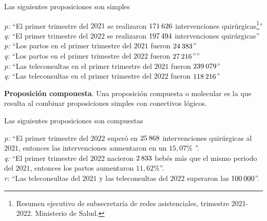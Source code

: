 \begin{myexample}
Las siguientes  proposiciones son simples
\end{myexample}
\noindent\textit{p:} ``El primer trimestre del $2021$ se realizaron $171\hspace{2px}626$ intervenciones quirúrgicas\footnote{Resumen ejecutivo de subsecretaría de redes asistenciales, trimestre 2021-2022. Ministerio de Salud.}''\\
\textit{q:} ``El primer trimestre del $2022$ se realizaron $197\hspace{2px}494$ intervenciones quirúrgicas''\\

\noindent\textit{p:} ``Los partos en el primer trimestre del $2021$ fueron $24\hspace{2px}383$''\\
\textit{q:} ``Los partos en el primer trimestre del $2022$ fueron $27\hspace{2px}216$''''\\

\noindent\textit{p:} ``Las teleconsultas en el primer trimestre del $2021$ fueron $239\hspace{2px}079$''\\
\textit{q:} ``Las teleconsultas en el primer trimestre del $2022$ fueron $118\hspace{2px}216$''\\

\begin{mydef}
\textbf{Proposición compouesta}. Una proposición compuesta o molecular es la que resulta al combinar proposiciones simples con conectivos lógicos.
\end{mydef}

\begin{myexample}
Las siguientes proposiciones son compuestas
\end{myexample}
\noindent\textit{p:} ``El primer trimestre del $2022$ superó en $25\hspace{2px}868$ intervenciones quirúrgicas al $2021$, entonces las intervenciones aumentaron en un $15,07\%$ ''.\\

\noindent\textit{q:} ``El primer trimestre del $2022$ nacieron $2\hspace{2px}833$ bebés más que el mismo periodo del $2021$, entonces los partos aumentaron $11,62\%$''.\\

\noindent\textit{r:} ``Las teleconsultas del $2021$ y las teleconsultas del $2022$ superaron las $100\hspace{2px}000$''.\\

